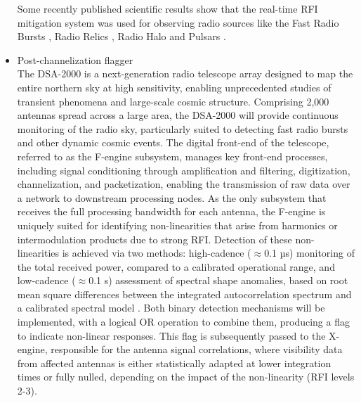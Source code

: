 \begin{itemize}
Some recently published scientific results show that the real-time RFI mitigation system was used for observing radio sources like the Fast Radio Bursts \citep{bethapudi2025rotation}, Radio Relics \citep{chatterjee2024new}, Radio Halo \citep{santra2024deep, manna2024radio} and Pulsars \citep{kumari2024first}.


\item Post-channelization flagger\\
The DSA-2000 is a next-generation radio telescope array designed to map the entire northern sky at high sensitivity, enabling unprecedented studies of transient phenomena and large-scale cosmic structure. Comprising 2,000 antennas spread across a large area, the DSA-2000 will provide continuous monitoring of the radio sky, particularly suited to detecting fast radio bursts and other dynamic cosmic events. The digital front-end of the telescope, referred to as the F-engine subsystem, manages key front-end processes, including signal conditioning through amplification and filtering, digitization, channelization, and packetization, enabling the transmission of raw data over a network to downstream processing nodes. As the only subsystem that receives the full processing bandwidth for each antenna, the F-engine is uniquely suited for identifying non-linearities that arise from harmonics or intermodulation products due to strong RFI. Detection of these non-linearities is achieved via two methods: high-cadence ($\approx$0.1 µs) monitoring of the total received power, compared to a calibrated operational range, and low-cadence ($\approx$0.1 s) assessment of spectral shape anomalies, based on root mean square differences between the integrated autocorrelation spectrum and a calibrated spectral model \citep{hellbourg2024flagging}. Both binary detection mechanisms will be implemented, with a logical OR operation to combine them, producing a flag to indicate non-linear responses. This flag is subsequently passed to the X-engine, responsible for the antenna signal correlations, where visibility data from affected antennas is either statistically adapted at lower integration times or fully nulled, depending on the impact of the non-linearity (RFI levels 2-3).
\end{itemize}

